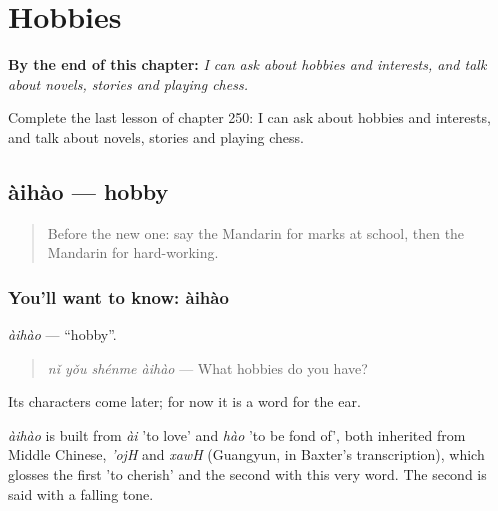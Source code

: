 
\chapter{Hobbies}
\label{ch:zh-hobbies}

\begin{chapteropening}
\textbf{By the end of this chapter:} \emph{I can ask about hobbies and interests, and talk about novels, stories and playing chess.}

Complete the last lesson of chapter 250: I can ask about hobbies and interests, and talk about novels, stories and playing chess.
\end{chapteropening}

\section[àihào]{àihào — hobby}

\label{lesson:ZH-C250-aihao}



\begin{quote}
Before the new one: say the Mandarin for marks at school, then the Mandarin for hard-working.
\end{quote}

\subsection*{You'll want to know: àihào}
\emph{àihào} — \textquotedblleft{}hobby\textquotedblright{}.

\begin{quote}
\emph{nǐ yǒu shénme àihào} — What hobbies do you have?
\end{quote}

Its characters come later; for now it is a word for the ear.

\begin{cousinweb}
\emph{àihào} is built from \emph{ài} 'to love' and \emph{hào} 'to be fond of', both inherited from Middle Chinese, \emph{'ojH} and \emph{xawH} (Guangyun, in Baxter's transcription), which glosses the first 'to cherish' and the second with this very word. The second is  said with a falling tone.
\end{cousinweb}

